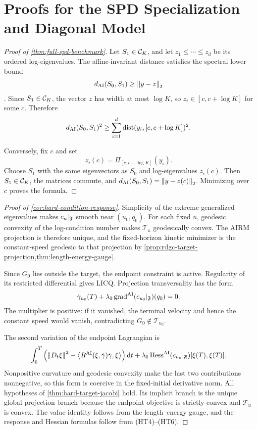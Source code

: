 \section{Proofs for the SPD Specialization and Diagonal Model}
\label{app:spd-diagonal-proofs}

\begin{proof}[Proof of \cref{thm:full-spd-benchmark}]
Let \(S_1\in\mathcal C_K\), and let \(z_1\le\cdots\le z_d\) be its ordered
log-eigenvalues.  The affine-invariant distance satisfies the spectral lower
bound
\[
  d_{\mathrm{AI}}(S_0,S_1)\ge\left\lVert y-z\right\rVert_2
\]
\cite{bhatia2007positive}.  Since \(S_1\in\mathcal C_K\), the vector \(z\) has
width at most \(\log K\), so \(z_i\in[c,c+\log K]\) for some \(c\).
Therefore
\[
  d_{\mathrm{AI}}(S_0,S_1)^2
  \ge
  \sum_{i=1}^d\operatorname{dist}(y_i,[c,c+\log K])^2.
\]

Conversely, fix \(c\) and set
\[
  z_i(c)=\Pi_{[c,c+\log K]}(y_i).
\]
Choose \(S_1\) with the same eigenvectors as \(S_0\) and log-eigenvalues
\(z_i(c)\).  Then \(S_1\in\mathcal C_K\), the matrices commute, and
\(d_{\mathrm{AI}}(S_0,S_1)=\left\lVert y-z(c)\right\rVert_2\).  Minimizing over \(c\) proves the
formula.
\end{proof}

\begin{proof}[Proof of \cref{cor:hard-condition-response}]
Simplicity of the extreme generalized eigenvalues makes \(c_u|_{\mathfrak F}\)
smooth near \((u_0,q_0)\).  For each fixed \(u\), geodesic convexity of the
log-condition number makes \(\mathcal T_u\) geodesically convex.  The AIRM
projection is therefore unique, and the fixed-horizon kinetic minimizer is the
constant-speed geodesic to that projection by
\cref{prop:rdgc-target-projection,thm:length-energy-gauge}.

Since \(G_0\) lies outside the target, the endpoint constraint is active.
Regularity of its restricted differential gives LICQ.  Projection
transversality has the form
\[
  \dot\gamma_{u_0}(T)
  +\lambda_0\operatorname{grad}^{\mathrm{AI}}(c_{u_0}|_{\mathfrak F})(q_0)=0.
\]
The multiplier is positive: if it vanished, the terminal velocity and hence
the constant speed would vanish, contradicting
\(G_0\notin\mathcal T_{u_0}\).

The second variation of the endpoint Lagrangian is
\[
  \int_0^T\left(
  \left\lVert D_t\xi\right\rVert^2
  -\left\langle R^{\mathrm{AI}}(\xi,\dot\gamma)\dot\gamma,\xi\right\rangle
  \right)\mathrm d t
  +\lambda_0\operatorname{Hess}^{\mathrm{AI}}(c_{u_0}|_{\mathfrak F})
  [\xi(T),\xi(T)].
\]
Nonpositive curvature and geodesic convexity make the last two contributions
nonnegative, so this form is coercive in the fixed-initial derivative norm.
All hypotheses of \cref{thm:hard-target-jacobi} hold.  Its implicit branch is
the unique global projection branch because the endpoint objective is
strictly convex and \(\mathcal T_u\) is convex.  The value identity follows
from the length--energy gauge, and the response and Hessian formulas follow
from \textup{(HT4)}--\textup{(HT6)}.
\end{proof}

